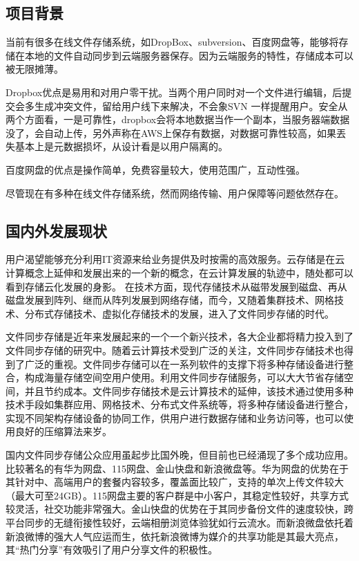 \documentclass[UTF8]{ctexart}
\begin{document}
\subsection{项目背景}
当前有很多在线文件存储系统，如DropBox、subversion、百度网盘等，能够将存储在本地的文件自动同步到云端服务器保存。因为云端服务的特性，存储成本可以被无限摊薄。

Dropbox优点是易用和对用户零干扰。当两个用户同时对一个文件进行编辑，后提交会多生成冲突文件，留给用户线下来解决，不会象SVN 一样提醒用户。安全从两个方面看，一是可靠性，dropbox会将本地数据当作一个副本，当服务器端数据没了，会自动上传，另外声称在AWS上保存有数据，对数据可靠性较高，如果丟失基本上是元数据损坏，从设计看是以用户隔离的。

百度网盘的优点是操作简单，免费容量较大，使用范围广，互动性强。

尽管现在有多种在线文件存储系统，然而网络传输、用户保障等问题依然存在。

\subsection{国内外发展现状}
用户渴望能够充分利用IT资源来给业务提供及时按需的高效服务。云存储是在云计算概念上延伸和发展出来的一个新的概念，在云计算发展的轨迹中，随处都可以看到存储云化发展的身影。
在技术方面，现代存储技术从磁带发展到磁盘、再从磁盘发展到阵列、继而从阵列发展到网络存储，而今，又随着集群技术、网格技术、分布式存储技术、虚拟化存储技术的发展，进入了文件同步存储的时代。

文件同步存储是近年来发展起来的一个一个新兴技术，各大企业都将精力投入到了文件同步存储的研究中。随着云计算技术受到广泛的关注，文件同步存储技术也得到了广泛的重视。文件同步存储可以在一系列软件的支撑下将多种存储设备进行整合，构成海量存储空间空用户使用。利用文件同步存储服务，可以大大节省存储空间，并且节约成本。文件同步存储技术是云计算技术的延伸，该技术通过使用多种技术手段如集群应用、网格技术、分布式文件系统等，将多种存储设备进行整合，实现不同架构存储设备的协同工作，供用户进行数据存储和业务访问等，也可以使用良好的压缩算法来岁。

国内文件同步存储公众应用虽起步比国外晚，但目前也已经涌现了多个成功应用。比较著名的有华为网盘、115网盘、金山快盘和新浪微盘等。华为网盘的优势在于其针对中、高端用户的套餐内容较多，覆盖面比较广，支持的单次上传文件较大（最大可至24GB）。115网盘主要的客户群是中小客户，其稳定性较好，共享方式较灵活，社交功能非常强大。金山快盘的优势在于其同步备份文件的速度较快，跨平台同步的无缝衔接性较好，云端相册浏览体验犹如行云流水。而新浪微盘依托着新浪微博的强大人气应运而生，依托新浪微博为媒介的共享功能是其最大亮点，其“热门分享”有效吸引了用户分享文件的积极性。
\end{document}
